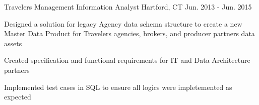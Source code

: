 \begin{cventries}
  \cventry
    {Travelers} %
    {Management Information Analyst} %
    {Hartford, CT} %
    {Jun. 2013 - Jun. 2015} %
    {
      \begin{cvitems} %
        \item {Designed a solution for legacy Agency data schema structure to create a new Master Data Product for 
        Travelers agencies, brokers, and producer partners data assets}
        \item {Created specification and functional requirements for IT and Data Architecture partners}
        \item {Implemented test cases in SQL to ensure all logics were impletemented as expected} 
      \end{cvitems}
    }

\end{cventries}

